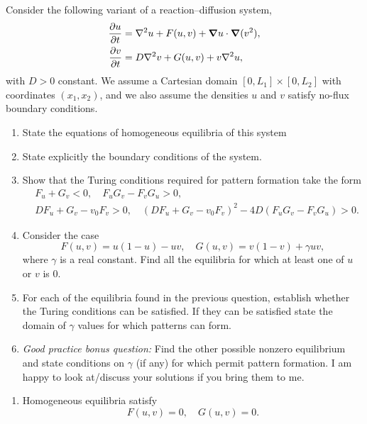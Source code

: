 \documentclass[a4paper, 12pt]{article}
\begin{document}
\begin{enumerate}[label={\bf \arabic{*}.\;}, ref={\arabic{*}},itemsep=3ex, left=0ex]
      {
        Consider the following variant of a reaction--diffusion system,
        \begin{subequations}
          \begin{align}
            \pd{u}{t} &= \nabla^2 u +  F(u,v) + \vnabla u \cdot \vnabla (v^2),\\
            \pd{v}{t} &=  D\nabla^2 v +  G(u,v)+ v\nabla^2 u,
          \end{align}
        \end{subequations}
        with $D>0$ constant. We assume a Cartesian domain $[0,L_1]\times[0,L_2]$ with coordinates $(x_1,x_2)$, and we also assume the densities $u$ and $v$ satisfy no-flux boundary conditions.
        \begin{enumerate}[label=(\alph*)]
          \item{State the equations of homogeneous equilibria of this system
            }
          \item{
              State explicitly the boundary conditions of the system.
            }
          \item{Show that the Turing conditions required for pattern formation take the form
              \begin{align}
                &F_u + G_v<0,\quad  F_uG_v- F_vG_u>0,\nonumber\\
                &D F_u + G_v - v_0 F_v >0, \quad \left(D F_u + G_v - v_0 F_v\right)^2 - 4D(F_uG_v- F_vG_u)>0.
              \end{align}
            }
          \item{
              Consider the case
              \begin{equation}
                F(u,v) = u(1-u) - uv,\quad G(u,v)= v(1-v) + \gamma u v,
              \end{equation}
              where $\gamma$ is a real constant. Find all the equilibria for which at least one of  $u$ or $v$ is $0$.
            }
          \item{For each of the equilibria found in the previous question, establish whether the Turing conditions can be satisfied. If they can be satisfied state the  domain of $\gamma$ values for which patterns can form.
            }
          \item{\emph{Good practice bonus question:} Find the other possible nonzero equilibrium and state conditions on $\gamma$ (if any) for which permit pattern formation. I am happy to look at/discuss your solutions if you bring them to me.}
        \end{enumerate}
      }
      {
        \begin{enumerate}[label=(\alph*)]
          \item Homogeneous equilibria satisfy
            \begin{equation}
              F(u,v) = 0,\quad G(u,v)=0.
            \end{equation}


\end{enumerate}}
\end{enumerate}
\end{document}
